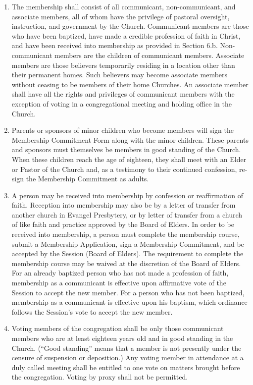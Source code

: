 \documentclass[
]{book}
\begin{document}
\begin{enumerate}
\def\labelenumi{\alph{enumi}.}
\item
  The membership shall consist of all communicant, non-communicant, and associate members, all of whom have the privilege of pastoral oversight, instruction, and government by the Church. Com­mun­icant members are those who have been baptized, have made a credible profession of faith in Christ, and have been received into membership as provided in Section 6.b. Non-communicant members are the children of communicant members. Associate members are those believers temporarily residing in a location other than their permanent homes. Such believers may become associate members without ceasing to be members of their home Churches. An associate member shall have all the rights and privileges of communicant members with the exception of voting in a congregational meeting and holding office in the Church.
\item
  Parents or sponsors of minor children who become members will sign the Membership Commitment Form along with the minor children. These parents and sponsors must themselves be members in good standing of the Church. When these children reach the age of eighteen, they shall meet with an Elder or Pastor of the Church and, as a testimony to their continued confession, re-sign the Membership Commitment as adults.
\item
  A person may be received into membership by confession or reaffirmation of faith. Reception into membership may also be by a letter of transfer from another church in Evangel Presbytery, or by letter of transfer from a church of like faith and practice approved by the Board of Elders. In order to be received into membership, a person must complete the membership course, submit a Membership Application, sign a Membership Commitment, and be accepted by the Session (Board of Elders). The requirement to complete the membership course may be waived at the discretion of the Board of Elders. For an already baptized person who has not made a profession of faith, membership as a communicant is effective upon affirmative vote of the Session to accept the new member. For a person who has not been baptized, membership as a communicant is effective upon his baptism, which ordinance follows the Session's vote to accept the new member.
\item
  Voting members of the congregation shall be only those communicant members who are at least eighteen years old and in good standing in the Church. (``Good standing'' means that a member is not presently under the censure of suspension or deposition.) Any voting member in attendance at a duly called meeting shall be entitled to one vote on matters brought before the congregation. Voting by proxy shall not be permitted.

\end{enumerate}
\end{document}
